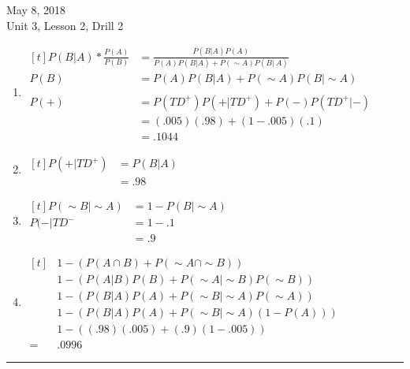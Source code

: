 \documentclass[final]{article}
\begin{document}
\noindent May 8, 2018\\
Unit 3, Lesson 2, Drill 2
\begin{enumerate}
\item
\begin{math}
\begin{aligned}[t]
P(B|A) * \frac{P(A)}{P(B)} &= \frac{P(B|A) P(A)}{P(A)P(B|A) + P(\sim A)P(B|~A)}\\
P(B) &= P(A) P(B|A) + P(\sim A)P(B|\sim A)\\ \\
P(+)  &= P(TD^{+})P(+|TD^{+}) + P(-)P(TD^{+}|-)\\
& = (.005)(.98)+(1-.005)(.1)\\
&=.1044
\end{aligned}
\end{math}

\item 
\begin{math}
\begin{aligned}[t]
P(+ |TD^{+}) &= P(B|A) \\
& = .98
\end{aligned}
\end{math}

\item 
\begin{math}
\begin{aligned}[t]
P(\sim B|\sim A) &= 1- P(B| \sim A)\\
P(-|TD^{-} &= 1-.1\\
&=.9
\end{aligned}
\end{math}

\item 
\begin{math}
\begin{aligned}[t]
& 1-(P(A\cap B) + P(\sim A\cap \sim B))\\
&1-(P(A | B) P(B)+ P(\sim A | \sim B) P(\sim B))\\
&1-(P(B | A) P(A)+ P(\sim B | \sim A) P(\sim A))\\
&1-(P(B | A) P(A)+ P(\sim B | \sim A) (1-P(A)))\\
&1-((.98)(.005) + (.9)(1-.005))\\
=&.0996
\end{aligned}
\end{math}

\end{enumerate}
\vspace{14pt}
\hrule
\vspace{24pt}
\pagebreak
\end{document}
